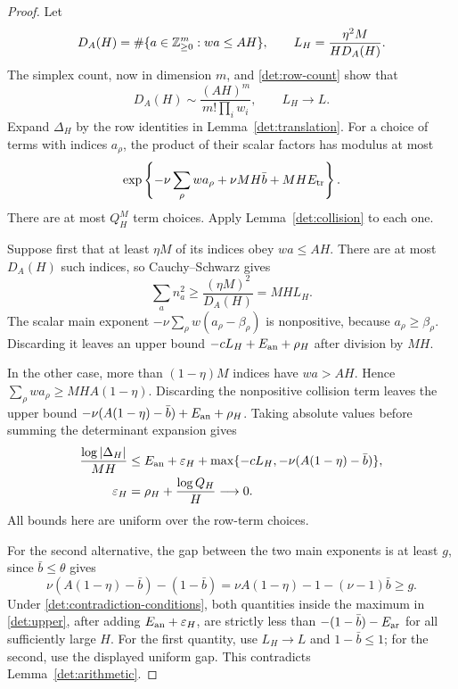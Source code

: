 \begin{proof}
Let
\[
 D_A(H)=\#\{a\in\mathbb Z_{\ge0}^m:wa\le AH\},
 \qquad L_H=\frac{\eta^2M}{H D_A(H)}.
\]
The simplex count, now in dimension $m$, and
\eqref{det:row-count} show that
\[
 D_A(H)\sim\frac{(AH)^m}{m!\prod_iw_i},
 \qquad L_H\longrightarrow L.
\]
Expand $\Delta_H$ by the row identities in
Lemma~\ref{det:translation}.  For a choice of terms with indices
$a_\rho$, the product of their scalar factors has modulus at most
\[
 \exp\left\{-\nu\sum_\rho wa_\rho
             +\nu MH\bar b+MH E_{\rm tr}\right\}.
\]
There are at most $Q_H^M$ term choices.  Apply
Lemma~\ref{det:collision} to each one.

Suppose first that at least $\eta M$ of its indices obey $wa\le AH$.
There are at most $D_A(H)$ such indices, so Cauchy--Schwarz gives
\[
 \sum_a n_a^2\ge\frac{(\eta M)^2}{D_A(H)}=MH L_H.
\]
The scalar main exponent $-\nu\sum_\rho w(a_\rho-\beta_\rho)$ is
nonpositive, because $a_\rho\ge\beta_\rho$.  Discarding it leaves
an upper bound $-cL_H+E_{\rm an}+\rho_H$ after division by $MH$.

In the other case, more than $(1-\eta)M$ indices have $wa>AH$.
Hence $\sum_\rho wa_\rho\ge MH A(1-\eta)$.  Discarding the
nonpositive collision term leaves the upper bound
$-\nu(A(1-\eta)-\bar b)+E_{\rm an}+\rho_H$.
Taking absolute values before summing the determinant expansion gives
\begin{equation}
 \begin{aligned}
 \frac{\log|\Delta_H|}{MH}
 &\le E_{\rm an}+\varepsilon_H+
       \max\{-cL_H,-\nu(A(1-\eta)-\bar b)\},\\
 \varepsilon_H&=\rho_H+\frac{\log Q_H}{H}\longrightarrow0.
 \end{aligned}
 \label{det:upper}
\end{equation}
All bounds here are uniform over the row-term choices.

For the second alternative, the gap between the two main exponents
is at least $g$, since $\bar b\le\theta$ gives
\[
 \nu(A(1-\eta)-\bar b)-(1-\bar b)
 =\nu A(1-\eta)-1-(\nu-1)\bar b\ge g.
\]
Under \eqref{det:contradiction-conditions}, both quantities inside the
maximum in \eqref{det:upper}, after adding
$E_{\rm an}+\varepsilon_H$, are strictly less than
$-(1-\bar b)-E_{\rm ar}$ for all sufficiently large $H$.  For the
first quantity, use $L_H\to L$ and $1-\bar b\le1$; for the second,
use the displayed uniform gap.  This contradicts
Lemma~\ref{det:arithmetic}.
\end{proof}
